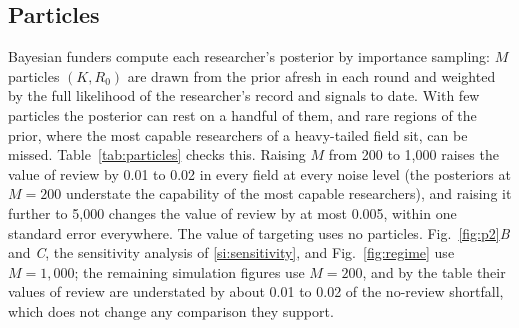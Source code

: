 \subsection*{Particles}
Bayesian funders compute each researcher's posterior by importance sampling: $M$ particles $(K, R_0)$ are drawn from the prior afresh in each round and weighted by the full likelihood of the researcher's record and signals to date. With few particles the posterior can rest on a handful of them, and rare regions of the prior, where the most capable researchers of a heavy-tailed field sit, can be missed. Table~\ref{tab:particles} checks this. Raising $M$ from 200 to 1{,}000 raises the value of review by 0.01 to 0.02 in every field at every noise level (the posteriors at $M = 200$ understate the capability of the most capable researchers), and raising it further to 5{,}000 changes the value of review by at most 0.005, within one standard error everywhere. The value of targeting uses no particles. Fig.~\ref{fig:p2}\textit{B} and \textit{C}, the sensitivity analysis of \ref{si:sensitivity}, and Fig.~\ref{fig:regime} use $M = 1{,}000$; the remaining simulation figures use $M = 200$, and by the table their values of review are understated by about 0.01 to 0.02 of the no-review shortfall, which does not change any comparison they support.

